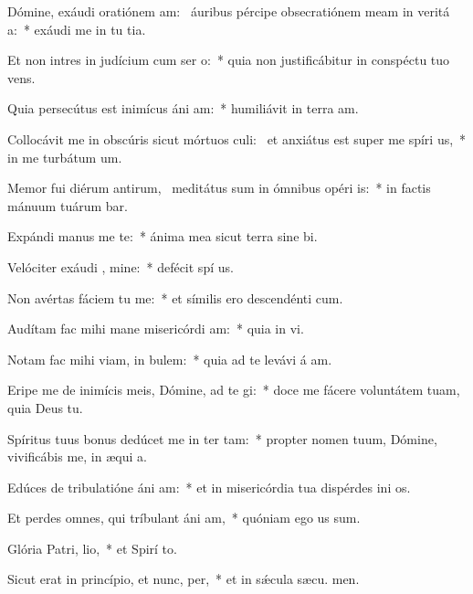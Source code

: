 \item Dómine, exáudi oratiónem am:~\pscross{} áuribus pércipe obsecratiónem meam in veritá a:~* exáudi me in tu tia.
\item Et non intres in judícium cum ser o:~* quia non justificábitur in conspéctu tuo  vens.
\item Quia persecútus est inimícus áni am:~* humiliávit in terra  am.
\item Collocávit me in obscúris sicut mórtuos culi:~\pscross{} et anxiátus est super me spíri us,~* in me turbátum   um.
\item Memor fui diérum antirum,~\pscross{} meditátus sum in ómnibus opéri is:~* in factis mánuum tuárum bar.
\item Expándi manus me  te:~* ánima mea sicut terra sine  bi.
\item Velóciter exáudi , mine:~* defécit spí us.
\item Non avértas fáciem tu  me:~* et símilis ero descendénti  cum.
\item Audítam fac mihi mane misericórdi am:~* quia in  vi.
\item Notam fac mihi viam, in  bulem:~* quia ad te levávi á am.
\item Eripe me de inimícis meis, Dómine, ad te gi:~* doce me fácere voluntátem tuam, quia Deus   tu.
\item Spíritus tuus bonus dedúcet me in ter tam:~* propter nomen tuum, Dómine, vivificábis me, in æqui a.
\item Edúces de tribulatióne áni am:~* et in misericórdia tua dispérdes ini os.
\item Et perdes omnes, qui tríbulant áni am,~* quóniam ego  us sum.
\item Glória Patri,  lio,~* et Spirí to.
\item Sicut erat in princípio, et nunc,  per,~* et in sǽcula sæcu. men.
